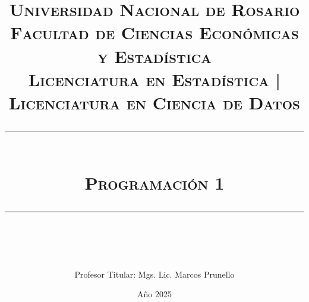 \newcommand{\horrule}[1]{\rule{\linewidth}{#1}}
\title{
	\normalfont \normalsize
	\textsc{
		Universidad Nacional de Rosario \\
		Facultad de Ciencias Económicas y Estadística \\
		Licenciatura en Estadística | Licenciatura en Ciencia de Datos
	} \\ [25pt]
	\Large \horrule{2pt} \\[0.4cm]
	\huge \textbf{\textsc{Programación 1}} \\
	\horrule{2pt} \\[0.5cm]
}

\vspace{10cm}
\author{
	Profesor Titular: Mgs. Lic. Marcos Prunello 
}

\date{
  Año 2025
}
